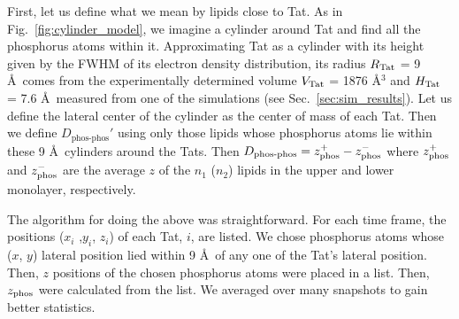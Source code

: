First, let us define what we mean by lipids close to Tat.  
As in Fig.~\ref{fig:cylinder_model}, we imagine a cylinder around Tat and 
find all the phosphorus atoms within it. 
Approximating Tat as a cylinder 
with its height given by the FWHM of its electron density distribution, 
its radius $R_\textrm{Tat}$ = 9 \AA\ comes from the experimentally determined volume $V_\textrm{Tat}$ = 1876 \AA$^3$ and 
$H_\textrm{Tat}$ = 7.6 \AA\ measured from one of the simulations (see Sec.~\ref{sec:sim_results}). 
Let us define the lateral center of the cylinder as the center of mass of each
Tat. Then we define $D_\textrm{phos-phos}'$ using only those lipids whose 
phosphorus atoms lie within these 9 \AA\ cylinders around the 
Tats. 
Then $D_\textrm{phos-phos} = z_\textrm{phos}^+ - z_\textrm{phos}^-$ where $z_\textrm{phos}^+$ and $z_\textrm{phos}^-$ 
are the average $z$ of the $n_1$ ($n_2$) lipids in the upper and lower monolayer, respectively.  

The algorithm for doing the above was straightforward.  
For each time frame, the positions ($x_i$ ,$y_i$, $z_i$) of each Tat, $i$, are 
listed.   
We chose phosphorus atoms whose ($x$, $y$) lateral position lied within 
9 \AA\ of any one of the Tat's lateral position. Then, $z$ positions
of the chosen phosphorus atoms were placed in a list. 
Then, $z_\textrm{phos}$ were calculated from the list. 
We averaged over many snapshots to gain better statistics. 

